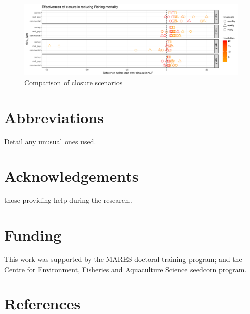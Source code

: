\documentclass[review]{elsarticle}
\begin{document}
\begin{figure}[!ht]
	\includegraphics[width = \linewidth]{../analysis/Overview_plot_highPop}
	\caption{Comparison of closure scenarios}
	\label{fig:4}
\end{figure}	

\section*{Abbreviations} Detail any unusual ones used.

\section*{Acknowledgements} those providing help during the research..

\section*{Funding} This work was supported by the MARES doctoral training
program; and the Centre for Environment, Fisheries and Aquaculture Science
seedcorn program.

\clearpage

\section*{References}


\end{document}
